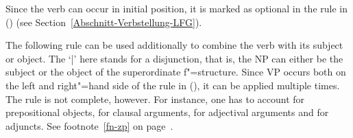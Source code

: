 Since the verb can occur in initial position, it is marked as optional in the rule in () (see Section~\ref{Abschnitt-Verbstellung-LFG}).

The following rule can be used additionally to combine the verb with its subject or object.
\ea
\label{lfg-vp-regel}
\z
The `|'\is{$\vert$} here stands for a disjunction, that is, the NP can either be the subject or the object of the superordinate f"=structure. Since VP occurs both on the left
and right"=hand side of the rule in (), it can be applied multiple times.
The rule is not complete, however. For instance, one has to account for prepositional objects, for clausal
arguments, for adjectival arguments and for adjuncts. See footnote~\ref{fn-zp} on page~\pageref{fn-zp}.

